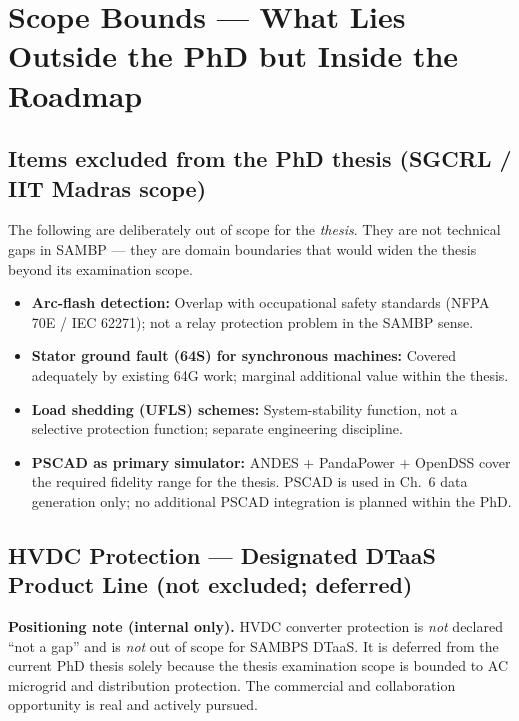 \documentclass[11pt, a4paper]{article}
\begin{document}
\section{Scope Bounds — What Lies Outside the PhD but Inside the Roadmap}

\subsection*{Items excluded from the PhD thesis (SGCRL / IIT Madras scope)}

The following are deliberately out of scope for the \emph{thesis}. They are
not technical gaps in SAMBP — they are domain boundaries that would widen the
thesis beyond its examination scope.

\begin{itemize}
  \item \textbf{Arc-flash detection:} Overlap with occupational safety standards
        (NFPA 70E / IEC 62271); not a relay protection problem in the SAMBP sense.
  \item \textbf{Stator ground fault (64S) for synchronous machines:} Covered
        adequately by existing 64G work; marginal additional value within the thesis.
  \item \textbf{Load shedding (UFLS) schemes:} System-stability function, not a
        selective protection function; separate engineering discipline.
  \item \textbf{PSCAD as primary simulator:} ANDES + PandaPower + OpenDSS cover the
        required fidelity range for the thesis. PSCAD is used in Ch.~6 data
        generation only; no additional PSCAD integration is planned within the PhD.
\end{itemize}

\subsection*{HVDC Protection — Designated DTaaS Product Line (not excluded; deferred)}

\begin{warnbox}
\textbf{Positioning note (internal only).}
HVDC converter protection is \emph{not} declared ``not a gap'' and is
\emph{not} out of scope for SAMBPS DTaaS. It is deferred from the current
PhD thesis solely because the thesis examination scope is bounded to
AC microgrid and distribution protection. The commercial and collaboration
opportunity is real and actively pursued.
\end{warnbox}
\end{document}

